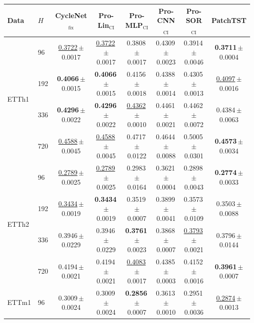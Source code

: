 \begin{tabular}{llcccccc}
\toprule
\textbf{Data} & $H$ & \textbf{CycleNet$_{\text{fix}}$} & \textbf{Pro-Lin$_{\text{CI}}$} & \textbf{Pro-MLP$_{\text{CI}}$} & \textbf{Pro-CNN$_{\text{CI}}$} & \textbf{Pro-SOR$_{\text{CI}}$} & \textbf{PatchTST} \\
\midrule
\multirow{4}{*}{ETTh1} & 96 & \underline{0.3722}\,{\tiny$\pm$0.0017} & \underline{0.3722}\,{\tiny$\pm$0.0017} & 0.3808\,{\tiny$\pm$0.0017} & 0.4309\,{\tiny$\pm$0.0023} & 0.3914\,{\tiny$\pm$0.0046} & \textbf{0.3711}\,{\tiny$\pm$0.0004} \\
 & 192 & \textbf{0.4066}\,{\tiny$\pm$0.0015} & \textbf{0.4066}\,{\tiny$\pm$0.0015} & 0.4156\,{\tiny$\pm$0.0018} & 0.4388\,{\tiny$\pm$0.0014} & 0.4305\,{\tiny$\pm$0.0013} & \underline{0.4097}\,{\tiny$\pm$0.0016} \\
 & 336 & \textbf{0.4296}\,{\tiny$\pm$0.0022} & \textbf{0.4296}\,{\tiny$\pm$0.0022} & \underline{0.4362}\,{\tiny$\pm$0.0010} & 0.4461\,{\tiny$\pm$0.0021} & 0.4462\,{\tiny$\pm$0.0072} & 0.4384\,{\tiny$\pm$0.0063} \\
 & 720 & \underline{0.4588}\,{\tiny$\pm$0.0045} & \underline{0.4588}\,{\tiny$\pm$0.0045} & 0.4717\,{\tiny$\pm$0.0122} & 0.4644\,{\tiny$\pm$0.0088} & 0.5005\,{\tiny$\pm$0.0301} & \textbf{0.4573}\,{\tiny$\pm$0.0034} \\
\midrule
\multirow{4}{*}{ETTh2} & 96 & \underline{0.2789}\,{\tiny$\pm$0.0025} & \underline{0.2789}\,{\tiny$\pm$0.0025} & 0.2983\,{\tiny$\pm$0.0164} & 0.3621\,{\tiny$\pm$0.0004} & 0.2898\,{\tiny$\pm$0.0043} & \textbf{0.2774}\,{\tiny$\pm$0.0033} \\
 & 192 & \underline{0.3434}\,{\tiny$\pm$0.0019} & \textbf{0.3434}\,{\tiny$\pm$0.0019} & 0.3519\,{\tiny$\pm$0.0007} & 0.3899\,{\tiny$\pm$0.0041} & 0.3573\,{\tiny$\pm$0.0109} & 0.3503\,{\tiny$\pm$0.0088} \\
 & 336 & 0.3946\,{\tiny$\pm$0.0229} & 0.3946\,{\tiny$\pm$0.0229} & \textbf{0.3761}\,{\tiny$\pm$0.0023} & 0.3868\,{\tiny$\pm$0.0007} & \underline{0.3793}\,{\tiny$\pm$0.0021} & 0.3796\,{\tiny$\pm$0.0144} \\
 & 720 & 0.4194\,{\tiny$\pm$0.0021} & 0.4194\,{\tiny$\pm$0.0021} & \underline{0.4083}\,{\tiny$\pm$0.0017} & 0.4385\,{\tiny$\pm$0.0003} & 0.4152\,{\tiny$\pm$0.0016} & \textbf{0.3961}\,{\tiny$\pm$0.0007} \\
\midrule
\multirow{4}{*}{ETTm1} & 96 & 0.3009\,{\tiny$\pm$0.0024} & 0.3009\,{\tiny$\pm$0.0024} & \textbf{0.2856}\,{\tiny$\pm$0.0007} & 0.3613\,{\tiny$\pm$0.0010} & 0.2951\,{\tiny$\pm$0.0036} & \underline{0.2874}\,{\tiny$\pm$0.0013} \\

\end{tabular}
